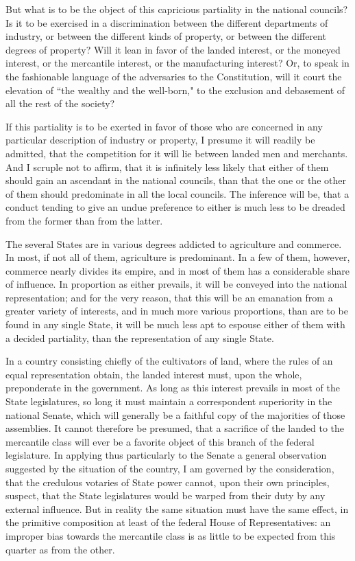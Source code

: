 But what is to be the object of this capricious partiality in the national councils? Is it to be exercised in a discrimination between the different departments of industry, or between the different kinds of property, or between the different degrees of property? Will it lean in favor of the landed interest, or the moneyed interest, or the mercantile interest, or the manufacturing interest? Or, to speak in the fashionable language of the adversaries to the Constitution, will it court the elevation of ``the wealthy and the well-born," to the exclusion and debasement of all the rest of the society?

If this partiality is to be exerted in favor of those who are concerned in any particular description of industry or property, I presume it will readily be admitted, that the competition for it will lie between landed men and merchants. And I scruple not to affirm, that it is infinitely less likely that either of them should gain an ascendant in the national councils, than that the one or the other of them should predominate in all the local councils. The inference will be, that a conduct tending to give an undue preference to either is much less to be dreaded from the former than from the latter.

The several States are in various degrees addicted to agriculture and commerce. In most, if not all of them, agriculture is predominant. In a few of them, however, commerce nearly divides its empire, and in most of them has a considerable share of influence. In proportion as either prevails, it will be conveyed into the national representation; and for the very reason, that this will be an emanation from a greater variety of interests, and in much more various proportions, than are to be found in any single State, it will be much less apt to espouse either of them with a decided partiality, than the representation of any single State.

In a country consisting chiefly of the cultivators of land, where the rules of an equal representation obtain, the landed interest must, upon the whole, preponderate in the government. As long as this interest prevails in most of the State legislatures, so long it must maintain a correspondent superiority in the national Senate, which will generally be a faithful copy of the majorities of those assemblies. It cannot therefore be presumed, that a sacrifice of the landed to the mercantile class will ever be a favorite object of this branch of the federal legislature. In applying thus particularly to the Senate a general observation suggested by the situation of the country, I am governed by the consideration, that the credulous votaries of State power cannot, upon their own principles, suspect, that the State legislatures would be warped from their duty by any external influence. But in reality the same situation must have the same effect, in the primitive composition at least of the federal House of Representatives: an improper bias towards the mercantile class is as little to be expected from this quarter as from the other.

